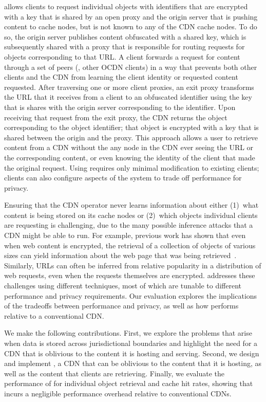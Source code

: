 \system{} allows clients to request individual objects with identifiers that
are encrypted with a key that is shared by an open proxy and the origin server
that is pushing content to cache nodes, but is not known to any of the CDN
cache nodes.  To do so, the origin server publishes content obfuscated with a
shared key, which is subsequently shared with a proxy that is responsible for
routing requests for objects corresponding to that URL.  A client forwards a
request for content through a set of peers (\ie, other OCDN clients) in a way
that prevents both other clients  and the CDN from learning the client
identity or requested content requested.  After traversing one or more client
proxies, an exit proxy transforms the URL that it receives from a client to an
obfuscated identifier using the key that is shares with the origin server
corresponding to the identifier.  Upon receiving that request from the exit
proxy, the CDN returns the object corresponding to the object identifier; that
object is encrypted with a key that is shared between the origin and the
proxy. This approach allows a user to retrieve content from a CDN without the
any node in the CDN ever seeing the URL or the corresponding content, or even knowing
the identity of the client that made the original request. Using \system{} requires
only minimal modification to existing clients; clients can also configure aspects
of the system to trade off performance for privacy.

Ensuring that the CDN operator never
learns information about either (1)~what content is being stored on its cache
nodes or (2)~which objects individual clients are requesting is
challenging, due to the many possible inference attacks that a CDN might be
able to run. For example, previous work has shown that even when web content
is encrypted, the retrieval of a collection of objects of various sizes can
yield information about the web page that was being retrieved~\cite{panchenko2016website,
cai2012touching}. Similarly, URLs
can often be inferred from relative popularity in a distribution of web
requests, even when the requests themselves are encrypted. \system{} addresses
these challenges using different techniques, most of which are tunable to different 
performance and privacy requirements.  Our evaluation explores the implications of 
the tradeoffs between performance and privacy, as
well as how \system{} performs relative to a conventional CDN.

We make the following contributions. First, we explore the problems that
arise when data is stored across jurisdictional boundaries and highlight the
need for a CDN that is oblivious to the content it is hosting and serving.
Second, we design and implement \system{}, a CDN that can be oblivious to the
content that it is hosting, as well as the content that clients are
retrieving. Finally, we evaluate the performance of \system{} for individual
object retrieval and cache hit rates, showing that \system{} incurs a negligible performance
overhead relative to conventional CDNs.

